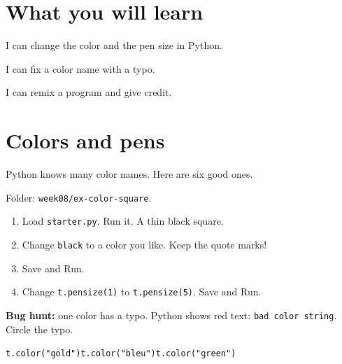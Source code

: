 
\section{What you will learn}
\begin{ican}
  \item I can change the color and the pen size in Python.
  \item I can fix a color name with a typo.
  \item I can remix a program and give credit.
\end{ican}

\section{Colors and pens}
Python knows many color names. Here are six good ones.
\begin{center}
\end{center}

\begin{exercise}
Folder: \texttt{week08/ex-color-square}.
\begin{enumerate}[leftmargin=1.4em,itemsep=2pt]
  \item Load \texttt{starter.py}. Run it. A thin black square.
  \item Change \texttt{black} to a color you like. Keep the quote marks!
  \item Save and Run.
  \item Change \texttt{t.pensize(1)} to \texttt{t.pensize(5)}. Save and Run.
\end{enumerate}
\textbf{Bug hunt:} one color has a typo. Python shows red text: \texttt{bad color string}. Circle the typo.
\begin{center}
\texttt{t.color("gold")}\qquad\texttt{t.color("bleu")}\qquad\texttt{t.color("green")}
\end{center}
\end{exercise}

